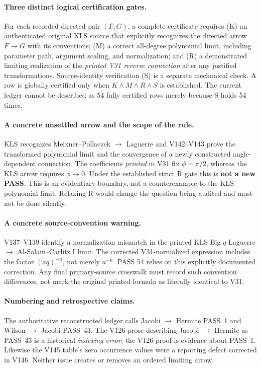 \documentclass[11pt]{article}
\begin{document}
\paragraph{Three distinct logical certification gates.} For each recorded directed pair $(F,G)$, a complete certificate requires (K) an authenticated original KLS source that explicitly recognizes the directed arrow $F\to G$ with its conventions; (M) a correct all-degree polynomial limit, including parameter path, argument scaling, and normalization; and (R) a demonstrated limiting realization of the \emph{printed V31 reverse connection} after any justified transformations. Source-identity verification (S) is a separate mechanical check. A row is globally certified only when $K\wedge M\wedge R\wedge S$ is established. The current ledger cannot be described as 54 fully certified rows merely because S holds 54 times.

\paragraph{A concrete unsettled arrow and the scope of the rule.} KLS recognizes Meixner--Pollaczek $\to$ Laguerre and V142--V143 prove the transformed polynomial limit and the convergence of a newly constructed angle-dependent connection. The coefficients \emph{printed} in V31 fix $\phi=\pi/2$, whereas the KLS arrow requires $\phi\to0$. Under the established strict R gate this is \textbf{not a new PASS}. This is an evidentiary boundary, not a counterexample to the KLS polynomial limit. Relaxing R would change the question being audited and must not be done silently.

\paragraph{A concrete source-convention warning.} V137--V139 identify a normalization mismatch in the printed KLS Big $q$-Laguerre $\to$ Al-Salam--Carlitz I limit. The corrected V31-normalized expression includes the factor $(aq)^{-n}$, not merely $a^{-n}$. PASS 54 relies on this explicitly documented correction. Any final primary-source crosswalk must record such convention differences, not mark the original printed formula as literally identical to V31.

\paragraph{Numbering and retrospective claims.} The authoritative reconstructed ledger calls Jacobi $\to$ Hermite PASS~1 and Wilson $\to$ Jacobi PASS~43. The V126 prose describing Jacobi $\to$ Hermite as PASS~43 is a historical \emph{indexing error}; the V126 proof is evidence about PASS~1. Likewise the V145 table's zero occurrence values were a reporting defect corrected in V146. Neither issue creates or removes an ordered limiting arrow.
\end{document}
